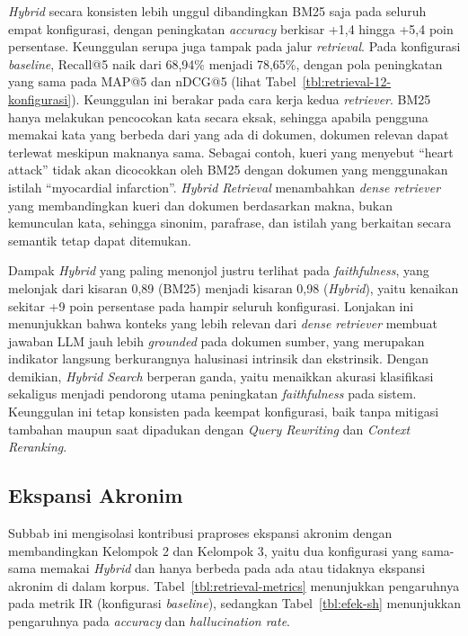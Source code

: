 \textit{Hybrid} secara konsisten lebih unggul dibandingkan BM25 saja pada seluruh empat konfigurasi, dengan peningkatan \textit{accuracy} berkisar +1{,}4 hingga +5{,}4 poin persentase. Keunggulan serupa juga tampak pada jalur \textit{retrieval}. Pada konfigurasi \textit{baseline}, Recall@5 naik dari 68{,}94\% menjadi 78{,}65\%, dengan pola peningkatan yang sama pada MAP@5 dan nDCG@5 (lihat Tabel~\ref{tbl:retrieval-12-konfigurasi}). Keunggulan ini berakar pada cara kerja kedua \textit{retriever}. BM25 hanya melakukan pencocokan kata secara eksak, sehingga apabila pengguna memakai kata yang berbeda dari yang ada di dokumen, dokumen relevan dapat terlewat meskipun maknanya sama. Sebagai contoh, kueri yang menyebut ``heart attack'' tidak akan dicocokkan oleh BM25 dengan dokumen yang menggunakan istilah ``myocardial infarction''. \textit{Hybrid Retrieval} menambahkan \textit{dense retriever} yang membandingkan kueri dan dokumen berdasarkan makna, bukan kemunculan kata, sehingga sinonim, parafrase, dan istilah yang berkaitan secara semantik tetap dapat ditemukan.

Dampak \textit{Hybrid} yang paling menonjol justru terlihat pada \textit{faithfulness}, yang melonjak dari kisaran 0{,}89 (BM25) menjadi kisaran 0{,}98 (\textit{Hybrid}), yaitu kenaikan sekitar +9 poin persentase pada hampir seluruh konfigurasi. Lonjakan ini menunjukkan bahwa konteks yang lebih relevan dari \textit{dense retriever} membuat jawaban LLM jauh lebih \textit{grounded} pada dokumen sumber, yang merupakan indikator langsung berkurangnya halusinasi intrinsik dan ekstrinsik. Dengan demikian, \textit{Hybrid Search} berperan ganda, yaitu menaikkan akurasi klasifikasi sekaligus menjadi pendorong utama peningkatan \textit{faithfulness} pada sistem. Keunggulan ini tetap konsisten pada keempat konfigurasi, baik tanpa mitigasi tambahan maupun saat dipadukan dengan \textit{Query Rewriting} dan \textit{Context Reranking}.

\subsection{Ekspansi Akronim}
\label{subsec:efek-sh}

Subbab ini mengisolasi kontribusi praproses ekspansi akronim dengan membandingkan Kelompok 2 dan Kelompok 3, yaitu dua konfigurasi yang sama-sama memakai \textit{Hybrid} dan hanya berbeda pada ada atau tidaknya ekspansi akronim di dalam korpus. Tabel~\ref{tbl:retrieval-metrics} menunjukkan pengaruhnya pada metrik IR (konfigurasi \textit{baseline}), sedangkan Tabel~\ref{tbl:efek-sh} menunjukkan pengaruhnya pada \textit{accuracy} dan \textit{hallucination rate}.

